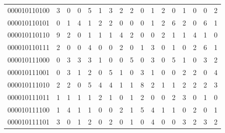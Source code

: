 \documentclass[10pt,a4paper]{article}
\begin{document}
\begin{longtable}{ |c|c|c|c|c|c|c|c|c|c|c|c|c|c|c|c|c| }
    000010110100              & 3                            & 0                                & 0                            & 5                              & 1   & 3   & 2   & 2   & 0   & 1   & 2   & 0   & 1   & 0   & 0   & 2   \\
    000010110101              & 0                            & 1                                & 4                            & 1                              & 2   & 2   & 0   & 0   & 0   & 1   & 2   & 6   & 2   & 0   & 6   & 1   \\
    000010110110              & 9                            & 2                                & 0                            & 1                              & 1   & 1   & 4   & 2   & 0   & 0   & 2   & 1   & 1   & 4   & 1   & 0   \\
    000010110111              & 2                            & 0                                & 0                            & 4                              & 0   & 0   & 2   & 0   & 1   & 3   & 0   & 1   & 0   & 2   & 6   & 1   \\
    000010111000              & 0                            & 3                                & 3                            & 3                              & 1   & 0   & 0   & 5   & 0   & 3   & 0   & 5   & 1   & 0   & 3   & 2   \\
    000010111001              & 0                            & 3                                & 1                            & 2                              & 0   & 5   & 1   & 0   & 3   & 1   & 0   & 0   & 2   & 2   & 0   & 4   \\
    000010111010              & 2                            & 2                                & 0                            & 5                              & 4   & 4   & 1   & 1   & 8   & 2   & 1   & 1   & 2   & 2   & 2   & 3   \\
    000010111011              & 1                            & 1                                & 1                            & 1                              & 2   & 1   & 0   & 1   & 2   & 0   & 0   & 2   & 3   & 0   & 1   & 0   \\
    000010111100              & 1                            & 4                                & 1                            & 1                              & 0   & 0   & 2   & 1   & 5   & 4   & 1   & 1   & 0   & 2   & 0   & 1   \\
    000010111101              & 3                            & 0                                & 1                            & 2                              & 0   & 2   & 0   & 1   & 0   & 4   & 0   & 0   & 3   & 2   & 3   & 2   \\

\end{longtable}
\end{document}
